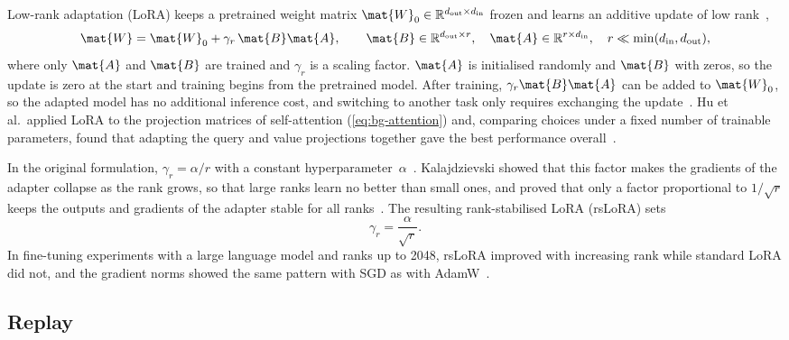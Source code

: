 Low-rank adaptation (LoRA) keeps a pretrained weight matrix $\mat{W}_0 \in \mathbb{R}^{d_{\mathrm{out}} \times d_{\mathrm{in}}}$ frozen and learns an additive update of low rank~\cite[Sec.~4.1]{hu2022lora},
\begin{equation}
\mat{W} = \mat{W}_0 + \gamma_r \, \mat{B}\mat{A},
\qquad \mat{B} \in \mathbb{R}^{d_{\mathrm{out}} \times r}, \quad \mat{A} \in \mathbb{R}^{r \times d_{\mathrm{in}}}, \quad r \ll \min(d_{\mathrm{in}}, d_{\mathrm{out}}),
\label{eq:bg-lora}
\end{equation}
where only $\mat{A}$ and $\mat{B}$ are trained and $\gamma_r$ is a scaling factor.
$\mat{A}$ is initialised randomly and $\mat{B}$ with zeros, so the update is zero at the start and training begins from the pretrained model.
After training, $\gamma_r\mat{B}\mat{A}$ can be added to $\mat{W}_0$, so the adapted model has no additional inference cost, and switching to another task only requires exchanging the update~\cite[Sec.~4.1]{hu2022lora}.
Hu et al.\ applied LoRA to the projection matrices of self-attention (\cref{eq:bg-attention}) and, comparing choices under a fixed number of trainable parameters, found that adapting the query and value projections together gave the best performance overall~\cite[Sec.~4.2, 7.1, Table~5]{hu2022lora}.

In the original formulation, $\gamma_r = \alpha / r$ with a constant hyperparameter~$\alpha$~\cite[Sec.~4.1]{hu2022lora}.
Kalajdzievski showed that this factor makes the gradients of the adapter collapse as the rank grows, so that large ranks learn no better than small ones, and proved that only a factor proportional to $1/\sqrt{r}$ keeps the outputs and gradients of the adapter stable for all ranks~\cite[Sec.~2.1, 3]{kalajdzievski2023rankstabilizationscalingfactor}.
The resulting rank-stabilised LoRA (rsLoRA) sets
\begin{equation}
\gamma_r = \frac{\alpha}{\sqrt{r}}.
\label{eq:bg-rslora}
\end{equation}
In fine-tuning experiments with a large language model and ranks up to 2048, rsLoRA improved with increasing rank while standard LoRA did not, and the gradient norms showed the same pattern with SGD as with AdamW~\cite[Sec.~4]{kalajdzievski2023rankstabilizationscalingfactor}.

\subsection{Replay}
\label{subsec:bg-replay}

